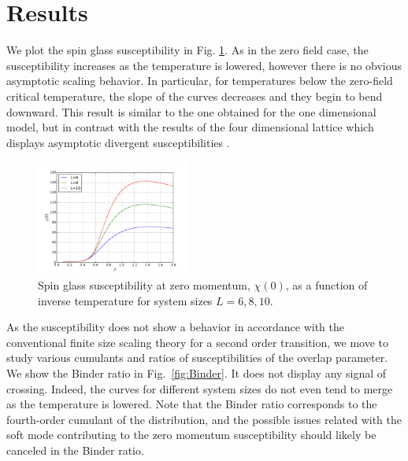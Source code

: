 \documentclass[aps,prb,twocolumn,showpacs,superscriptaddress]{revtex4}
\begin{document}
\section{Results} 
We plot the spin glass susceptibility in Fig. \ref{fig:Chi}. As in the 
zero field case, the susceptibility increases as the temperature is lowered, however there is
no obvious asymptotic scaling behavior. In particular, for temperatures below  
the zero-field critical temperature, the
slope of the curves decreases and they begin to bend downward. This result is similar to the one obtained for
the one dimensional model\cite{Larson-etal-2013}, but in contrast with the results of the four dimensional lattice 
which displays asymptotic divergent susceptibilities \cite{Marinari-etal-1998}.

\begin{figure}[ht]
  \includegraphics[width=0.45\textwidth]{img/chi.pdf}%
  \caption{\label{fig:Chi} Spin glass susceptibility at zero momentum, $\chi(0)$, as a function of inverse temperature 
for system sizes $L=6,8,10$.}
\end{figure}


As the susceptibility does not show a behavior in accordance with the conventional 
finite size scaling theory for a second order transition, we move to study various 
cumulants and ratios of susceptibilities of the overlap parameter. We show the Binder ratio in Fig.~\ref{fig:Binder}. It does not display any signal of crossing. 
Indeed, the curves for different system sizes do not even tend to merge as the temperature 
is lowered.  Note that the Binder ratio corresponds to the fourth-order cumulant of the 
distribution, and 
the possible issues related with the soft mode  
contributing to the zero momentum susceptibility should likely be canceled in the Binder ratio.
\end{document}
